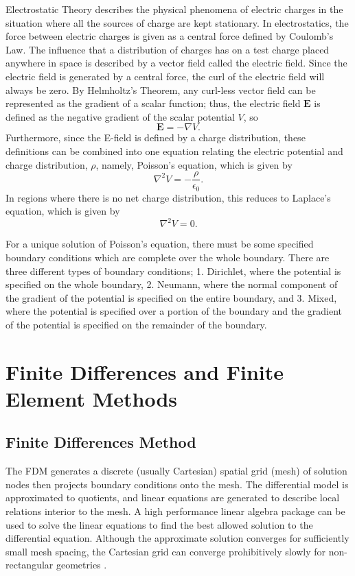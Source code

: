 \documentclass{PoS}
\begin{document}
Electrostatic Theory describes the physical phenomena of electric charges in the situation where all the sources of charge are kept stationary. In electrostatics, the force between electric charges is given as a central force defined by Coulomb’s Law. The influence that a distribution of charges has on a test charge placed anywhere in space is described by a vector field called the electric field. Since the electric field is generated by a central force, the curl of the electric field will always be zero. By Helmholtz's Theorem, any curl-less vector field can be represented as the gradient of a scalar function;  thus, the electric field $\mathbf{E}$ is defined as the negative gradient of the scalar potential $V$, so
\begin{equation}
    \mathbf{E} = -\nabla V.
\end{equation}
Furthermore, since the E-field is defined by a charge distribution, these definitions can be combined into one equation relating the electric potential and charge distribution, $\rho$, namely, Poisson’s equation, which is given by 
\begin{equation}
    \nabla^2 V = -\frac{\rho}{\epsilon_0}.
\end{equation}
In regions where there is no net charge distribution, this reduces to Laplace’s equation, which is given by 
\begin{equation}
    \nabla^2 V = 0.
\end{equation}

For a unique solution of Poisson’s equation, there must be some specified boundary conditions which are complete over the whole boundary. There are three different types of boundary conditions; 1. Dirichlet, where the potential is specified on the whole boundary, 2. Neumann, where the normal component of the gradient of the potential is specified on the entire boundary, and 3. Mixed, where the potential is specified over a portion of the boundary and the gradient of the potential is specified on the remainder of the boundary. 

\newpage
\section{Finite Differences and Finite Element Methods}

\subsection{Finite Differences Method}
The FDM generates a discrete (usually Cartesian) spatial grid (mesh) of solution nodes then projects boundary conditions onto the mesh. The differential model is approximated to quotients, and linear equations are generated to describe local relations interior to the mesh. A high performance linear algebra package can be used to solve the linear equations to find the best allowed solution to the differential equation. Although the approximate solution converges for sufficiently small mesh spacing, the Cartesian grid can converge prohibitively slowly for non-rectangular geometries \cite{Landau2015}.
\end{document}

